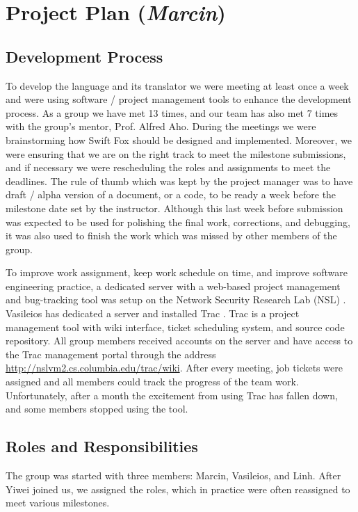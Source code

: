 \section{Project Plan (\textit{Marcin})}
\label{sec:project_plan}

\subsection{Development Process}

To develop the language and its translator we were meeting at least once a 
week and were using software / project management tools to enhance the
development process. As a group we have met 13 times, and our team has also
met 7 times with the group's mentor, Prof. Alfred Aho. During the meetings 
we were brainstorming how Swift Fox should be designed and implemented.
Moreover, we were ensuring that we are on the right track to meet the
milestone submissions, and if necessary we were rescheduling the roles and 
assignments to meet the deadlines. The rule of thumb which was kept by the 
project manager was to have draft / alpha version of a document, or a code,
to be ready a week before the milestone date set by the instructor. Although this
last week before submission was expected to be used for polishing the final
work, corrections, and debugging, it was also used to finish the work which
was missed by other members of the group. 

To improve work assignment, keep work schedule on time, and improve
software engineering practice, a dedicated server with a web-based project
management and bug-tracking tool was setup on the Network Security
Research Lab (NSL) \cite{nsl}. Vasileios has dedicated a server and
installed Trac \cite{trac}. Trac is a project management tool with wiki
interface, ticket scheduling system, and source code repository. All group 
members received accounts on the server and have access to the Trac
management portal through the address
\url{http://nslvm2.cs.columbia.edu/trac/wiki}. After every meeting, job
tickets were assigned and all members could track the progress of the team 
work. Unfortunately, after a month the excitement from using Trac has
fallen down, and some members stopped using the tool.

\subsection{Roles and Responsibilities}

The group was started with three members: Marcin, Vasileios, and Linh.
After Yiwei joined us, we assigned the roles, which in practice were often 
reassigned to meet various milestones.

